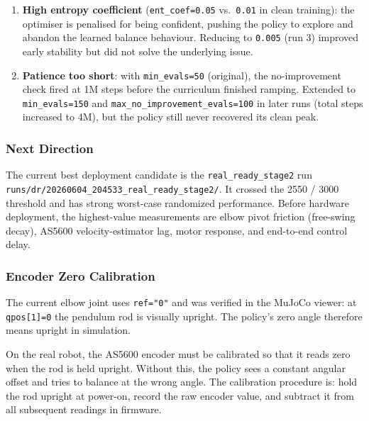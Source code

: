 \documentclass[12pt,a4paper]{article}
\begin{document}
\begin{enumerate}
    \item \textbf{High entropy coefficient} (\texttt{ent\_coef=0.05} vs.\
          \texttt{0.01} in clean training): the optimiser is penalised for
          being confident, pushing the policy to explore and abandon the
          learned balance behaviour. Reducing to \texttt{0.005} (run 3)
          improved early stability but did not solve the underlying issue.
    \item \textbf{Patience too short}: with \texttt{min\_evals=50}
          (original), the no-improvement check fired at 1M steps before the
          curriculum finished ramping. Extended to \texttt{min\_evals=150}
          and \texttt{max\_no\_improvement\_evals=100} in later runs (total
          steps increased to 4M), but the policy still never recovered its
          clean peak.
\end{enumerate}

\subsubsection{Next Direction}

The current best deployment candidate is the \texttt{real\_ready\_stage2} run
\texttt{runs/dr/20260604\_204533\_real\_ready\_stage2/}.  It crossed the
2550 / 3000 threshold and has strong worst-case randomized performance.  Before
hardware deployment, the highest-value measurements are elbow pivot friction
(free-swing decay), AS5600 velocity-estimator lag, motor response, and
end-to-end control delay.

\subsubsection{Encoder Zero Calibration}

The current elbow joint uses \texttt{ref="0"} and was verified in the MuJoCo
viewer: at \texttt{qpos[1]=0} the pendulum rod is visually upright.  The
policy's zero angle therefore means upright in simulation.

On the real robot, the AS5600 encoder must be calibrated so that it reads zero
when the rod is held upright. Without this, the policy sees a constant angular
offset and tries to balance at the wrong angle. The calibration procedure is:
hold the rod upright at power-on, record the raw encoder value, and subtract it
from all subsequent readings in firmware.

\end{document}
